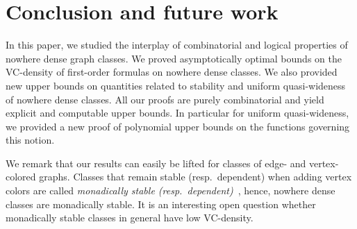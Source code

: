\section{Conclusion and future work}

In this paper, we studied the interplay of combinatorial and 
logical properties of nowhere dense graph classes. We proved
asymptotically optimal bounds on the VC-density of first-order 
formulas on nowhere dense classes. We also provided new
upper bounds on quantities related to stability and uniform quasi-wideness 
of nowhere dense classes.  All our proofs are purely combinatorial 
and yield explicit and computable upper bounds. In particular 
for uniform quasi-wideness, we provided a new
proof of polynomial upper bounds on the functions 
governing this notion. 

We remark that our results can easily be lifted for classes of edge- and 
vertex-colored graphs. Classes that remain stable (resp.\ dependent) when 
adding vertex colors are called \emph{monadically stable 
(resp.\ dependent)}~\cite{baldwin1985second}, hence, nowhere dense
classes are monadically stable. It is an interesting open question whether
monadically stable classes in general have low VC-density. 